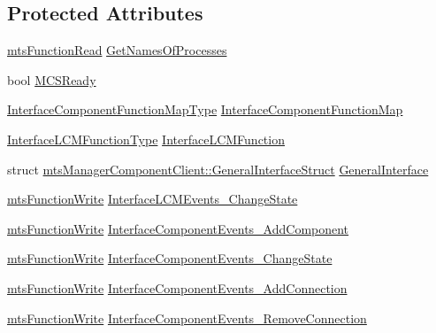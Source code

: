 \subsection*{Protected Attributes}
\begin{DoxyCompactItemize}
\item 
\hyperlink{classmts_function_read}{mts\+Function\+Read} \hyperlink{classmts_manager_component_client_a039ce2594011ffe9d642dc0f57e94862}{Get\+Names\+Of\+Processes}
\item 
bool \hyperlink{classmts_manager_component_client_abb3a505ba4d4fc2ac5f53c4ba4046b8e}{M\+C\+S\+Ready}
\item 
\hyperlink{classmts_manager_component_client_a6f0f9dde52834d02169c3b1feda1cab5}{Interface\+Component\+Function\+Map\+Type} \hyperlink{classmts_manager_component_client_a06b54faafc006ffcdf939c9db5226c6c}{Interface\+Component\+Function\+Map}
\item 
\hyperlink{structmts_manager_component_client_1_1_interface_l_c_m_function_type}{Interface\+L\+C\+M\+Function\+Type} \hyperlink{classmts_manager_component_client_a5ce720ccbed957a6b910e5f2dc27753a}{Interface\+L\+C\+M\+Function}
\item 
struct \hyperlink{structmts_manager_component_client_1_1_general_interface_struct}{mts\+Manager\+Component\+Client\+::\+General\+Interface\+Struct} \hyperlink{classmts_manager_component_client_a6b305bb0053c9737e4be5fc8b5c76425}{General\+Interface}
\item 
\hyperlink{classmts_function_write}{mts\+Function\+Write} \hyperlink{classmts_manager_component_client_ac4dcfc4dae7e316267a01205ccc05822}{Interface\+L\+C\+M\+Events\+\_\+\+Change\+State}
\item 
\hyperlink{classmts_function_write}{mts\+Function\+Write} \hyperlink{classmts_manager_component_client_a279bf7e8cd30152493fc75be7b4cae60}{Interface\+Component\+Events\+\_\+\+Add\+Component}
\item 
\hyperlink{classmts_function_write}{mts\+Function\+Write} \hyperlink{classmts_manager_component_client_a59623f6dd3cb2dc2ea90c52b97124ef7}{Interface\+Component\+Events\+\_\+\+Change\+State}
\item 
\hyperlink{classmts_function_write}{mts\+Function\+Write} \hyperlink{classmts_manager_component_client_ac15b602cb6ba9d6348a7913c1a22c69d}{Interface\+Component\+Events\+\_\+\+Add\+Connection}
\item 
\hyperlink{classmts_function_write}{mts\+Function\+Write} \hyperlink{classmts_manager_component_client_a59d4a84b08125eae36c441baf236d481}{Interface\+Component\+Events\+\_\+\+Remove\+Connection}
\end{DoxyCompactItemize}
